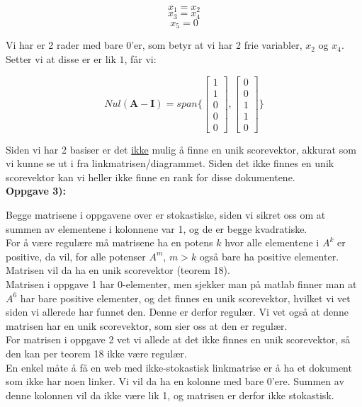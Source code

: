 \documentclass[a4paper,norsk,11pt,twoside]{article}
\begin{document}
$$
x_1 = x_2
$$
$$
x_3 = x_4
$$
$$
x_5 = 0
$$

Vi har er 2 rader med bare 0'er, som betyr at vi har 2 frie variabler, $x_2$ og $x_4$. Setter vi at disse er er lik $1$, får vi:

$$
Nul(\textbf{A} -\textbf{I}) = span\{ \begin{bmatrix}
1 \\ 1 \\ 0 \\ 0 \\ 0
\end{bmatrix},
\begin{bmatrix}
0 \\ 0 \\ 1 \\ 1 \\ 0
\end{bmatrix} \}
$$

Siden vi har 2 basiser er det \underline{ikke} mulig å finne en unik scorevektor, akkurat som vi kunne se ut i fra linkmatrisen/diagrammet. Siden det ikke finnes en unik scorevektor kan vi heller ikke finne en rank for disse dokumentene.\\



\textbf{Oppgave 3):}

Begge matrisene i oppgavene over er stokastiske, siden vi sikret oss om at summen av elementene i kolonnene var 1, og de er begge kvadratiske.\\

For å være regulære må matrisene ha en potens $k$ hvor alle elementene i $A^{k}$ er positive, da vil, for alle potenser $A^{m}$, $m>k$ også bare ha positive elementer. Matrisen vil da ha en unik scorevektor (teorem 18).\\

Matrisen i oppgave 1 har 0-elementer, men sjekker man på matlab finner man at $A^{6}$ har bare positive elementer, og det finnes en unik scorevektor, hvilket vi vet siden vi allerede har funnet den. Denne er derfor regulær. Vi vet også at denne matrisen har en unik scorevektor, som sier oss at den er regulær.\\

For matrisen i oppgave 2 vet vi allede at det ikke finnes en unik scorevektor, så den kan per teorem 18 ikke være regulær.\\

En enkel måte å få en web med ikke-stokastisk linkmatrise er å ha et dokument som ikke har noen linker. Vi vil da ha en kolonne med bare 0'ere. Summen av denne kolonnen vil da ikke være lik 1, og matrisen er derfor ikke stokastisk.\\
\end{document}
